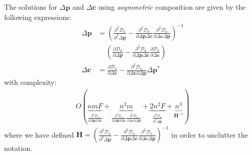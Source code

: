 The solutions for $\Delta\mathbf{p}$ and $\Delta\mathbf{c}$ using \emph{asymmetric} composition are given by the following expressions:
\begin{equation}
    \begin{aligned}
        \Delta \mathbf{p} & = \left(\frac{\partial^2 \mathcal{D}_a}{\partial^2 \Delta \mathbf{p}} - \frac{\partial^2 \mathcal{D}_a}{\partial \Delta \mathbf{p} \Delta \mathbf{c}} \frac{\partial^2 \mathcal{D}_a}{\partial \Delta \mathbf{c} \Delta \mathbf{p}} \right)^{-1}
        \\
        & \quad \, \left( \frac{\partial \mathcal{D}_a}{\partial \Delta \mathbf{p}} - \frac{\partial^2 \mathcal{D}_a}{\partial \Delta \mathbf{p} \Delta \mathbf{c}} \frac{\partial \mathcal{D}_a}{\partial \Delta \mathbf{c}} \right)
    	\\
        \Delta \mathbf{c} & = \frac{\partial \mathcal{D}_a}{\partial \Delta \mathbf{c}} - \frac{\partial^2 \mathcal{D}_a}{\partial \Delta \mathbf{c} \partial \Delta \mathbf{p}} \Delta \mathbf{p}^*
    \label{eq:asymmetric_newton_schur_solutions}
    \end{aligned}
\end{equation}
with complexity:
\begin{equation}
    \begin{aligned}
        O(
        \underbrace{nmF}_{\frac{\partial^2 \mathcal{D}_a}{\partial \Delta \mathbf{p} \partial \Delta \mathbf{c}}}
        +
        \underbrace{n^2m}_{\frac{\partial^2 \mathcal{D}_a}{\partial \Delta \mathbf{p} \partial \Delta \mathbf{c}} \frac{\partial^2 \mathcal{D}_a}{\partial \Delta \mathbf{c} \partial \Delta \mathbf{p}}}
        +
        \underbrace{2n^2F}_{\frac{\partial^2 \mathcal{D}_a}{\partial^2 \Delta \mathbf{p}}}
        +
        \underbrace{n^3}_{\mathbf{H}^{-1}}
        )
    \label{eq:complexity_sim_asymmetric_newton}
    \end{aligned}
\end{equation}
where we have defined $\mathbf{H} =\left(\frac{\partial^2 \mathcal{D}_a}{\partial^2 \Delta \mathbf{p}} - \frac{\partial^2 \mathcal{D}_a}{\partial \Delta \mathbf{p} \Delta \mathbf{c}} \frac{\partial^2 \mathcal{D}_a}{\partial \Delta \mathbf{c} \Delta \mathbf{p}} \right)^{-1}$ in order to unclutter the notation.

